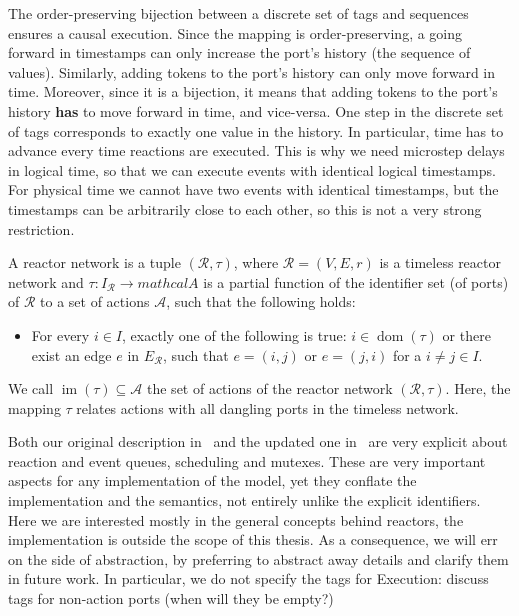 The order-preserving bijection between a discrete set of tags and sequences ensures a causal execution.
Since the mapping is order-preserving, a going forward in timestamps can only increase the port's history (the sequence of values).
Similarly, adding tokens to the port's history can only move forward in time. 
Moreover, since it is a bijection, it means that adding tokens to the port's history \textbf{has} to move forward in time, and vice-versa.
One step in the discrete set of tags corresponds to exactly one value in the history.
In particular, time has to advance every time reactions are executed. 
This is why we need microstep delays in logical time, so that we can execute events with identical logical timestamps.
For physical time we cannot have two events with identical timestamps, but the timestamps can be arbitrarily close to each other, so this is not a very strong restriction.

\begin{defn}
    \label{defn:reactor_network}
    A reactor network is a tuple $(\mathcal{R},\tau)$, where $\mathcal{R} = (V,E,r)$ is a timeless reactor network and $\tau : I_\mathcal{R} \rightarrow mathcal{A}$ is a partial function of the identifier set (of ports) of $\mathcal{R}$ to a set of actions $\mathcal{A}$, such that the following holds:
    \begin{itemize}
        \item For every $i \in I$, exactly one of the following is true: $i \in \operatorname{dom}(\tau)$ or there exist an edge $e$ in $E_{\mathcal{R}}$, such that $e = (i,j)$ or $e = (j,i)$ for a $i \neq j \in I$.
    \end{itemize}
\end{defn}

We call $\operatorname{im}(\tau) \subseteq \mathcal{A}$ the set of actions of the reactor network $(\mathcal{R},\tau)$.
Here, the mapping $\tau$ relates actions with all dangling ports in the timeless network.

Both our original description in~\cite{lohstroph_cyphy19} and the updated one in~\cite{lohstroh_phdthesis} are very explicit about reaction and event queues, scheduling and mutexes.
These are very important aspects for any implementation of the model, yet they conflate the implementation and the semantics, not entirely unlike the explicit identifiers.
Here we are interested mostly in the general concepts behind reactors, the implementation is outside the scope of this thesis.
As a consequence, we will err on the side of abstraction, by preferring to abstract away details and clarify them in future work. 
In particular, we do not specify the tags for 
Execution: discuss tags for non-action ports (when will they be empty?)

